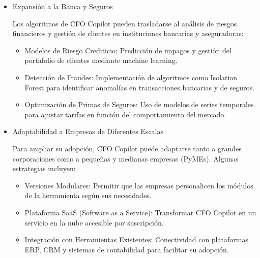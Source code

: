\documentclass[12pt,letterpaper,oneside]{report}
\renewcommand{\_}{\UnderscoreOriginal\allowbreak}
\begin{document}
\begin{itemize}
Las técnicas utilizadas en CFO Copilot pueden aplicarse en la optimización de la cadena de suministro y la logística:
\begin{itemize}
\item Gestión de Inventarios: Predicción de demanda de productos con modelos de series temporales.
\item Optimización de Rutas: Uso de machine learning para reducir costos operativos y mejorar la distribución.
\item Evaluación de Proveedores: Integración de análisis financiero para determinar la estabilidad económica de los proveedores y mitigar riesgos.
\end{itemize}

\item Expansión a la Banca y Seguros \parencite{Addo2018}

Los algoritmos de CFO Copilot pueden trasladarse al análisis de riesgos financieros y gestión de clientes en instituciones bancarias y aseguradoras:
\begin{itemize}
\item Modelos de Riesgo Crediticio: Predicción de impagos y gestión del portafolio de clientes mediante machine learning.
\item Detección de Fraudes: Implementación de algoritmos como Isolation Forest para identificar anomalías en transacciones bancarias y de seguros.
\item Optimización de Primas de Seguros: Uso de modelos de series temporales para ajustar tarifas en función del comportamiento del mercado.
\end{itemize}

\item Adaptabilidad a Empresas de Diferentes Escalas \parencite{Nadler2024}

Para ampliar su adopción, CFO Copilot puede adaptarse tanto a grandes corporaciones como a pequeñas y medianas empresas (PyMEs). Algunas estrategias incluyen:
\begin{itemize}
\item Versiones Modulares: Permitir que las empresas personalicen los módulos de la herramienta según sus necesidades.
\item Plataforma SaaS (Software as a Service): Transformar CFO Copilot en un servicio en la nube accesible por suscripción.
\item Integración con Herramientas Existentes: Conectividad con plataformas ERP, CRM y sistemas de contabilidad para facilitar su adopción.
\end{itemize}


\end{itemize}
\end{document}
